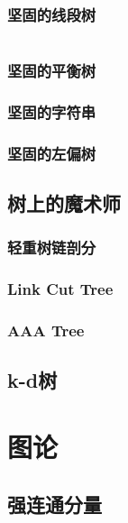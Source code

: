 \documentclass[a4paper]{article}
\newcommand{\cppcode}[1]{
    \inputminted[mathescape]{cpp}{source/#1}
}
\begin{document}
\subsubsection{坚固的线段树}

\cppcode{data-structure/persistent-segment-tree.cpp}

\subsubsection{坚固的平衡树}


\subsubsection{坚固的字符串}

\subsubsection{坚固的左偏树}

\subsection{树上的魔术师}

\subsubsection{轻重树链剖分}


\subsubsection{Link Cut Tree}

\subsubsection{AAA Tree}

\subsection{k-d树}

\section{图论}

\subsection{强连通分量}
\end{document}
